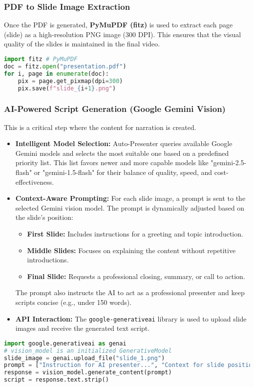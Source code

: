 \documentclass{article}
\begin{document}
\subsubsection{PDF to Slide Image Extraction}
Once the PDF is generated, \textbf{PyMuPDF (fitz)} is used to extract each page (slide) as a high-resolution PNG image (300 DPI). This ensures that the visual quality of the slides is maintained in the final video.
\begin{lstlisting}[language=Python, caption=PyMuPDF Image Extraction (Conceptual)]
import fitz # PyMuPDF
doc = fitz.open("presentation.pdf")
for i, page in enumerate(doc):
    pix = page.get_pixmap(dpi=300)
    pix.save(f"slide_{i+1}.png")
\end{lstlisting}

\subsubsection{AI-Powered Script Generation (Google Gemini Vision)}
This is a critical step where the content for narration is created.
\begin{itemize}
    \item \textbf{Intelligent Model Selection:} Auto-Presenter queries available Google Gemini models and selects the most suitable one based on a predefined priority list. This list favors newer and more capable models like "gemini-2.5-flash" or "gemini-1.5-flash" for their balance of quality, speed, and cost-effectiveness.
    \item \textbf{Context-Aware Prompting:} For each slide image, a prompt is sent to the selected Gemini vision model. The prompt is dynamically adjusted based on the slide's position:
        \begin{itemize}
            \item \textbf{First Slide:} Includes instructions for a greeting and topic introduction.
            \item \textbf{Middle Slides:} Focuses on explaining the content without repetitive introductions.
            \item \textbf{Final Slide:} Requests a professional closing, summary, or call to action.
        \end{itemize}
    The prompt also instructs the AI to act as a professional presenter and keep scripts concise (e.g., under 150 words).
    \item \textbf{API Interaction:} The \texttt{google-generativeai} library is used to upload slide images and receive the generated text script.
\end{itemize}
\begin{lstlisting}[language=Python, caption=Gemini Script Generation (Conceptual)]
import google.generativeai as genai
# vision_model is an initialized GenerativeModel
slide_image = genai.upload_file("slide_1.png")
prompt = ["Instruction for AI presenter...", "Context for slide position...", slide_image]
response = vision_model.generate_content(prompt)
script = response.text.strip()
\end{lstlisting}
\end{document}
